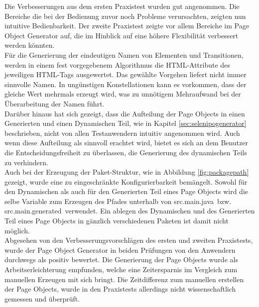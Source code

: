 Die Verbesserungen aus dem ersten Praxistest wurden gut angenommen. Die Bereiche die bei der Bedienung zuvor noch Probleme verursachten, zeigten nun intuitive Bedienbarkeit.
Der zweite Praxistest zeigte vor allem Bereiche im Page Object Generator auf, die im Hinblick auf eine höhere Flexibilität verbessert werden könnten.\\
Für die Generierung der eindeutigen Namen von Elementen und Transitionen, werden in einem fest vorgegebenem Algorithmus die HTML-Attribute des jeweiligen HTML-Tags ausgewertet. Das gewählte Vorgehen liefert nicht immer sinnvolle Namen. In ungünstigen Konstellationen kann es vorkommen, dass der gleiche Wert mehrmals erzeugt wird, was zu unnötigem Mehraufwand bei der Überarbeitung der Namen führt.\\
Darüber hinaus hat sich gezeigt, dass die Aufteilung der Page Objects in einen Generierten und einen Dynamischen Teil, wie in Kapitel \ref{sec:selenipogenerator} beschrieben, nicht von allen Testanwendern intuitiv angenommen wird.
Auch wenn diese Aufteilung als sinnvoll erachtet wird, bietet es sich an dem Benutzer die Entscheidungsfreiheit zu überlassen, die Generierung des dynamischen Teils zu verhindern.\\
Auch bei der Erzeugung der Paket-Struktur, wie in Abbildung \ref{fig:packagepath} gezeigt, wurde eine zu eingeschränkte Konfigurierbarkeit bemängelt.
Sowohl für den Dynamischen als auch für den Generierten Teil eines Page Objects wird die selbe Variable zum Erzeugen des Pfades unterhalb von \grq src.main.java\grq\ bzw. \grq src.main.generated\grq\ verwendet. Ein ablegen des Dynamischen und des Generierten Teil eines Page Objects in gänzlich verschiedenen Paketen ist damit nicht möglich.\\
Abgesehen von den Verbesserungsvorschlägen des ersten und zweiten Praxistests, wurde der Page Object Generator in beiden Prüfungen von den Anwendern durchwegs als positiv bewertet. Die Generierung der Page Objects wurde als Arbeitserleichterung empfunden, welche eine Zeitersparnis im Vergleich zum manuellen Erzeugen mit sich bringt. Die Zeitdifferenz zum manuellen erstellen der Page Objects, wurde in den Praxistests allerdings nicht wissenschaftlich gemessen und überprüft.


